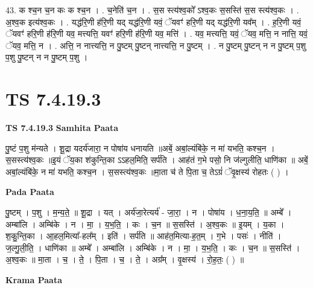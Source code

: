 \documentclass[17pt]{extarticle}
\begin{document}
43. क श्च॒न च॒न कः क श्च॒न । . च॒नेति॑ च॒न । . स॒स स्त्य॑श्व॒को᳚ ऽश्व॒कः स॒सस्ति॑ स॒स स्त्य॑श्व॒कः । . अ॒श्व॒क इत्य॑श्व॒कः । . यद्ध॑रि॒णी ह॑रि॒णी यद् यद्ध॑रि॒णी यवं॒ ॅयवꣳ॑ हरि॒णी यद् यद्ध॑रि॒णी यव᳚म् । . ह॒रि॒णी यवं॒ ॅयवꣳ॑ हरि॒णी ह॑रि॒णी यव॒ मत्त्यत्ति॒ यवꣳ॑ हरि॒णी ह॑रि॒णी यव॒ मत्ति॑ । . यव॒ मत्त्यत्ति॒ यवं॒ ॅयव॒ मत्ति॒ न नात्ति॒ यवं॒ ॅयव॒ मत्ति॒ न । . अत्ति॒ न नात्त्यत्ति॒ न पु॒ष्टम् पु॒ष्टन् नात्त्यत्ति॒ न पु॒ष्टम् । . न पु॒ष्टम् पु॒ष्टन् न न पु॒ष्टम् प॒शु प॒शु पु॒ष्टन् न न पु॒ष्टम् प॒शु । \newline
\pagebreak
{}

\section{ TS 7.4.19.3 }

\textbf{TS 7.4.19.3 } \newline
\textbf{Samhita Paata} \newline

पु॒ष्टं प॒शु म॑न्यते । शू॒द्रा यदर्य॑जारा॒ न पोषा॑य धनायति ॥अबें॒ अबां॒ल्यंबि॑के॒ न मा॑ यभति॒ कश्च॒न । स॒सस्त्य॑श्व॒कः ॥इ॒यं ॅय॒का श॑कुन्ति॒का ऽऽहल॒मिति॒ सर्प॑ति । आह॑तं ग॒भे पसो॒ नि ज॑ल्गुलीति॒ धाणि॑का ॥ अबें॒ अबां॒ल्यंबि॑के॒ न मा॑ यभति॒ कश्च॒न । स॒सस्त्य॑श्व॒कः ॥मा॒ता च॑ ते पि॒ता च॒ तेऽग्रं॑ ॅवृ॒क्षस्य॑ रोहतः ( ) । \newline

\textbf{Pada Paata} \newline

पु॒ष्टम् । प॒शु । म॒न्य॒ते॒ ॥ शू॒द्रा । यत् । अर्य॑जा॒रेत्यर्य॑ - जा॒रा॒ । न । पोषा॑य । ध॒ना॒य॒ति॒ ॥ अम्बे᳚ । अम्बा॑लि । अम्बि॑के । न । मा॒ । य॒भ॒ति॒ । कः । च॒न ॥ स॒सस्ति॑ । अ॒श्व॒कः ॥ इ॒यम् । य॒का । श॒कु॒न्ति॒का । आ॒हल॒मित्या᳚-हल᳚म् । इति॑ । सर्प॑ति ॥ आह॑त॒मित्या-ह॒त॒म् । ग॒भे । पसः॑ । नीति॑ । ज॒ल्गु॒ली॒ति॒ । धाणि॑का ॥ अम्बे᳚ । अम्बा॑लि । अम्बि॑के । न । मा॒ । य॒भ॒ति॒ । कः । च॒न ॥ स॒सस्ति॑ । अ॒श्व॒कः ॥ मा॒ता । च॒ । ते॒ । पि॒ता । च॒ । ते॒ । अग्र᳚म् । वृ॒क्षस्य॑ । रो॒ह॒तः॒ ( ) ॥  \newline


\textbf{Krama Paata} \newline
\end{document}
